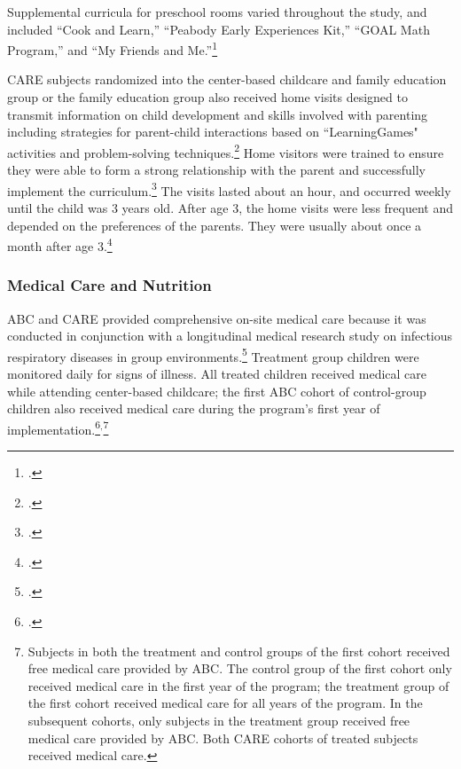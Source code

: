 \noindent Supplemental curricula for preschool rooms varied throughout the study, and included ``Cook and Learn,'' ``Peabody Early Experiences Kit,'' ``GOAL Math Program,'' and ``My Friends and Me.''\footnote{ \citet{Greenberg_Epstein_1973_BOOKBridgestoreading,Karnes1973,Dunn_Chun_etal_1976_BOOKPeabodyearlyeducation,Davis_1977_BOOKMyfriends,Wallach_1976_Teaching-All-Children}.}

\noindent CARE subjects randomized into the center-based childcare and family education group or the family education group also received home visits designed to transmit information on child development and skills involved with parenting including strategies for parent-child interactions based on ``LearningGames" activities and problem-solving techniques.\footnote{\citet{Bryant_et_al_1987_Carolina_Approach_TIECSE, Wasik_Ramey_etal_1990_CD, Burchinal_Campbell_etal_1997_CD}.} Home visitors were trained to ensure they were able to form a strong relationship with the parent and successfully implement the curriculum.\footnote{\citet{Bryant_et_al_1987_Carolina_Approach_TIECSE}.} The visits lasted about an hour, and occurred weekly until the child was 3 years old. After age 3, the home visits were less frequent and depended on the preferences of the parents. They were usually about once a month after age 3.\footnote{\citet{Bryant_et_al_1987_Carolina_Approach_TIECSE, Wasik_Ramey_etal_1990_CD, Burchinal_Campbell_etal_1997_CD}.} \\

\subsubsection{Medical Care and Nutrition}
ABC and CARE provided comprehensive on-site medical care because it was conducted in conjunction with a longitudinal medical research study on infectious respiratory diseases in group environments.\footnote{\citet{Henderson-et-al_1982_NEJoM}.} Treatment group children were monitored daily for signs of illness. All treated children received medical care while attending center-based childcare; the first ABC cohort of control-group children also received medical care during the program's first year of implementation.\footnote{\citet{Ramey_Collier_etal_1976_CarolinaAbecedarianProject, Bryant_et_al_1987_Carolina_Approach_TIECSE, Ramey_Campbell_1991_childreninpoverty,Campbell_Ramey_1994_CD}.}$^{,}$\footnote{Subjects in both the treatment and control groups of the first cohort received free medical care provided by ABC. The control group of the first cohort only received medical care in the first year of the program; the treatment group of the first cohort received medical care for all years of the program. In the subsequent cohorts, only subjects in the treatment group received free medical care provided by ABC. Both CARE cohorts of treated subjects received medical care.}\\

